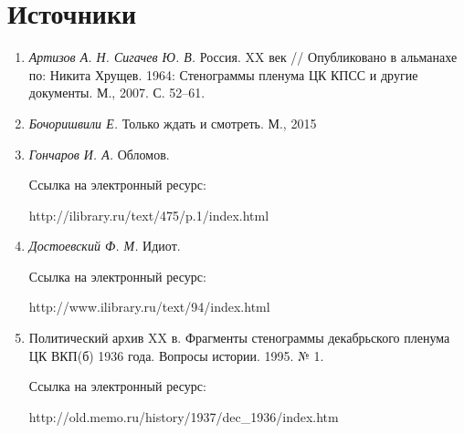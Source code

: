 
    \section*{Источники}
      \begin{enumerate}
        \item \textit{Артизов А. Н. Сигачев Ю. В.} Россия. XX век // Опубликовано в альманахе по: Никита Хрущев. 1964: Стенограммы пленума ЦК КПСС и другие документы. М., 2007. С. 52–61.
        \item \textit{Бочоришвили Е.} Только ждать и смотреть. М., 2015
        \item \textit{Гончаров И. А.} Обломов. \par Ссылка на электронный ресурс: \par http://ilibrary.ru/text/475/p.1/index.html
        \item \textit{Достоевский Ф. М.} Идиот. \par Ссылка на электронный ресурс: 
        \par http://www.ilibrary.ru/text/94/index.html
        \item Политический архив XX в. Фрагменты стенограммы декабрьского пленума ЦК ВКП(б) 1936 года. Вопросы истории. 1995. № 1. \par Ссылка на электронный ресурс:
        \par http://old.memo.ru/history/1937/dec\_1936/index.htm
      \end{enumerate}
      
